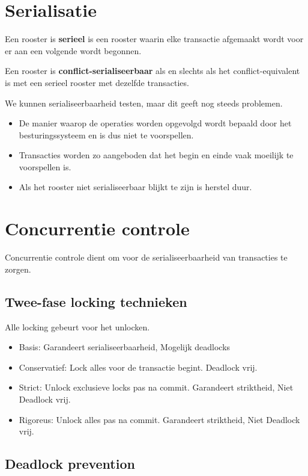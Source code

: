 \documentclass[transacties.tex]{subfiles}
\begin{document}
\section{Serialisatie}
\begin{de}
Een rooster is \textbf{serieel} is een rooster waarin elke transactie afgemaakt wordt voor er aan een volgende wordt begonnen.
\end{de}
\begin{de}
Een rooster is \textbf{conflict-serialiseerbaar} als en slechts als het conflict-equivalent is met een serieel rooster met dezelfde transacties.
\end{de}
We kunnen serialiseerbaarheid testen, maar dit geeft nog steeds problemen.
\begin{itemize}
\item De manier waarop de operaties worden opgevolgd wordt bepaald door het besturingssysteem en is dus niet te voorspellen.
\item Transacties worden zo aangeboden dat het begin en einde vaak moeilijk te voorspellen is.
\item Als het rooster niet serialiseerbaar blijkt te zijn is herstel duur.
\end{itemize}

\section{Concurrentie controle}
Concurrentie controle dient om voor de serialiseerbaarheid van transacties te zorgen.

\subsection{Twee-fase locking technieken}
Alle locking gebeurt voor het unlocken.
\begin{itemize}
\item Basis: Garandeert serialiseerbaarheid, Mogelijk deadlocks
\item Conservatief: Lock alles voor de transactie begint. Deadlock vrij.
\item Strict: Unlock exclusieve locks pas na commit. Garandeert striktheid, Niet Deadlock vrij.
\item Rigoreus: Unlock alles pas na commit. Garandeert striktheid, Niet Deadlock vrij.
\end{itemize}

\subsection{Deadlock prevention}
\end{document}
